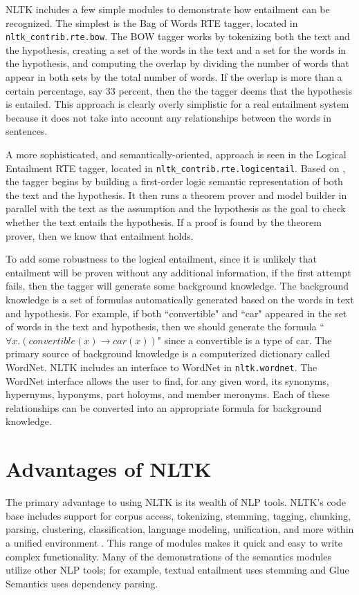 \documentclass{article}
\newcommand{\dhgcode}[1]{{\tt #1}}
\begin{document}
NLTK includes a few simple modules to demonstrate how entailment can be recognized.  The simplest is the Bag of Words RTE tagger, located in \dhgcode{nltk\_contrib.rte.bow}.  The BOW tagger works by tokenizing both the text and the hypothesis, creating a set of the words in the text and a set for the words in the hypothesis, and computing the overlap by dividing the number of words that appear in both sets by the total number of words.  If the overlap is more than a certain percentage, say 33 percent, then the the tagger deems that the hypothesis is entailed.  This approach is clearly overly simplistic for a real entailment system because it does not take into account any relationships between the words in sentences.

A more sophisticated, and semantically-oriented, approach is seen in the Logical Entailment RTE tagger, located in \dhgcode{nltk\_contrib.rte.logicentail}.  Based on \cite{BosRTE}, the tagger begins by building a first-order logic semantic representation of both the text and the hypothesis.  It then runs a theorem prover and model builder in parallel with the text as the assumption and the hypothesis as the goal to check whether the text entails the hypothesis.  If a proof is found by the theorem prover, then we know that entailment holds.

To add some robustness to the logical entailment, since it is unlikely that entailment will be proven without any additional information, if the first attempt fails, then the tagger will generate some background knowledge.  The background knowledge is a set of formulas automatically generated based on the words in text and hypothesis.  For example, if both ``convertible" and ``car" appeared in the set of words in the text and hypothesis, then we should generate the formula ``$\forall x.(convertible(x) \rightarrow car(x))$" since a convertible is a type of car.  The primary source of background knowledge is a computerized dictionary called WordNet.  NLTK includes an interface to WordNet in \dhgcode{nltk.wordnet}.  The WordNet interface allows the user to find, for any given word, its synonyms, hypernyms, hyponyms, part holoyms, and member meronyms.  Each of these relationships can be converted into an appropriate formula for background knowledge.


\section{Advantages of NLTK}
The primary advantage to using NLTK is its wealth of NLP tools.  NLTK's code base includes support for corpus access, tokenizing, stemming, tagging, chunking, parsing, clustering, classification, language modeling, unification, and more within a unified environment \cite{Multidisciplinary}.  This range of modules makes it quick and easy to write complex functionality.  Many of the demonstrations of the semantics modules utilize other NLP tools; for example, textual entailment uses stemming and Glue Semantics uses dependency parsing.
\end{document}
